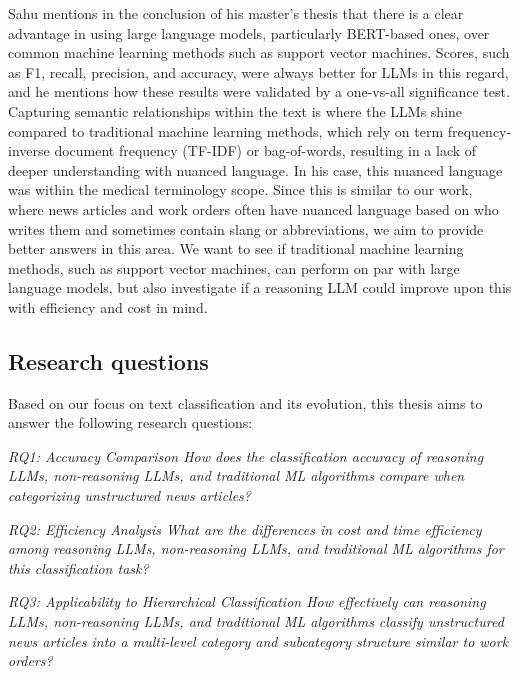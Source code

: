 Sahu \cite{sahu2025language} mentions in the conclusion of his master's thesis that there is a clear advantage in using large language models, particularly BERT-based ones, over common machine learning methods such as support vector machines. Scores, such as F1, recall, precision, and accuracy, were always better for LLMs in this regard, and he mentions how these results were validated by a one-vs-all significance test. Capturing semantic relationships within the text is where the LLMs shine compared to traditional machine learning methods, which rely on term frequency-inverse document frequency (TF-IDF) or bag-of-words, resulting in a lack of deeper understanding with nuanced language. In his case, this nuanced language was within the medical terminology scope. Since this is similar to our work, where news articles and work orders often have nuanced language based on who writes them and sometimes contain slang or abbreviations, we aim to provide better answers in this area. We want to see if traditional machine learning methods, such as support vector machines, can perform on par with large language models, but also investigate if a reasoning LLM could improve upon this with efficiency and cost in mind.



\subsection{Research questions}

Based on our focus on text classification and its evolution, this thesis aims to answer the following research questions:

\bigskip
\textit{RQ1: Accuracy Comparison
\newline
How does the classification accuracy of reasoning LLMs, non-reasoning LLMs, and traditional ML algorithms compare when categorizing unstructured news articles?}

\bigskip
\textit{RQ2: Efficiency Analysis
\newline
What are the differences in cost and time efficiency among reasoning LLMs, non-reasoning LLMs, and traditional ML algorithms for this classification task?}

\bigskip
\textit{RQ3: Applicability to Hierarchical Classification
\newline
How effectively can reasoning LLMs, non-reasoning LLMs, and traditional ML algorithms classify unstructured news articles into a multi-level category and subcategory structure similar to work orders?}

